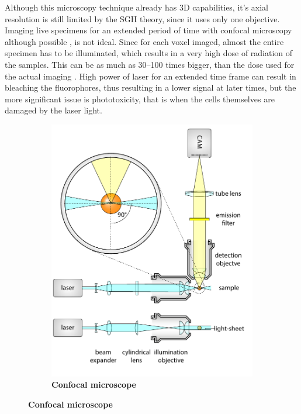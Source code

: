 \documentclass{diploma_style}
\begin{document}
Although this microscopy technique already has 3D capabilities, it's axial resolution is still limited by the SGH theory, since it uses only one objective. Imaging live specimens for an extended period of time with confocal microscopy although possible \cite{aldaz_live_2010}, is not ideal. Since for each voxel imaged, almost the entire specimen has to be illuminated, which results in a very high dose of radiation of the samples. This can be as much as 30--100 times bigger, than the dose used for the actual imaging \cite{reynaud_light_2008}. High power of laser for an extended time frame can result in bleaching the fluorophores, thus resulting in a lower signal at later times, but the more significant issue is phototoxicity, that is when the cells themselves are damaged by the laser light.

\begin{figure}
\begin{subfigure}[t]{0.49\textwidth}
    \centering
    \includegraphics[page=3,width=\textwidth]{figures/1_spim/spim_cyl}
    \caption{\textbf{Confocal microscope}}

\end{subfigure}
\end{figure}
\end{document}
